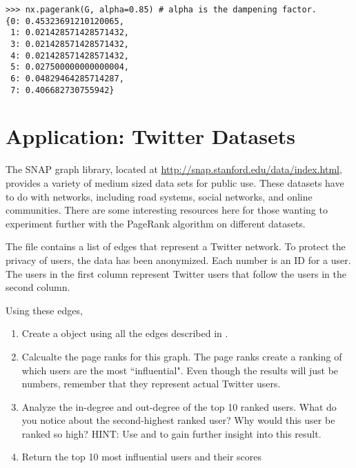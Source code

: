 \begin{lstlisting}
>>> nx.pagerank(G, alpha=0.85) # alpha is the dampening factor.
{0: 0.45323691210120065,
 1: 0.021428571428571432,
 3: 0.021428571428571432,
 4: 0.021428571428571432,
 5: 0.027500000000000004,
 6: 0.04829464285714287,
 7: 0.406682730755942}
\end{lstlisting}

\begin{comment}
\begin{figure}
\centering
\texttt{[image: sparse\_web.png]}
\caption{Output of the \li{spy} command on the adjacency matrix corresponding to the websites supported by Notre Dame University in 1999.
Data was taken from the SNAP datasets.}
\label{fig:WebSparse}
\end{figure}
\end{comment}

\section*{Application: Twitter Datasets}
The SNAP graph library, located at \url{http://snap.stanford.edu/data/index.html}, provides a variety of medium sized data sets for public use.
These datasets have to do with networks, including road systems, social networks, and online communities. There are some interesting resources here for those wanting to experiment further with the PageRank algorithm on different datasets.

\begin{problem}[Optional]
The  file contains a list of edges that represent a Twitter network.
To protect the privacy of users, the data has been anonymized.
Each number is an ID for a user.
The users in the first column represent Twitter users that follow the users in the second column.

Using these edges,
\begin{enumerate}
\item Create a  object using all the edges described in .
\item Calcualte the page ranks for this graph. The page ranks create a ranking of which users are the most ``influential". Even though the results will just be numbers, remember that they represent actual Twitter users.
\item Analyze the in-degree and out-degree of the top 10 ranked users. What do you notice about the second-highest ranked user? Why would this user be ranked so high? HINT: Use  and  to gain further insight into this result.
\item Return the top 10 most influential users and their scores
\end{enumerate}
\end{problem}
